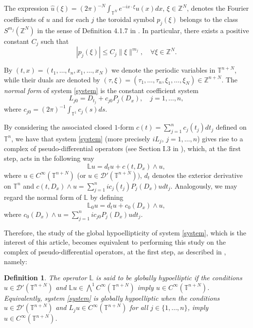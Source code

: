 \documentclass[12pt]{elsarticle}
\newtheorem{definition}[theorem]{Definition}
\numberwithin{equation}{section}
\begin{document}
The expression $\widehat{u}(\xi) = (2\pi)^{-N} \int_{\mathbb{T}^N}{e^{- i x \cdot \xi} u(x) dx}$, $\xi \in \mathbb{Z}^N$, denotes the Fourier coefficients of $u$ and for each $j$ the toroidal symbol  $p_j(\xi)$ belongs to the class $S^{m_j}(\mathbb{Z}^N)$ in the sense of Definition 4.1.7 in \cite{RT3}. In particular, there exists  a positive constant $C_j$ such that 
\begin{equation}\label{bound-symb}
|p_j(\xi)| \leq C_j \|\xi\| ^{m_j}, \quad \forall \xi \in \mathbb{Z}^{N}.
\end{equation}

By $(t,x)=(t_1,\ldots,t_n,x_1,\ldots,x_N)$ we denote the periodic variables in $\mathbb{T}^{n+N}$, while their duals  are denoted by 
$(\tau, \xi) = (\tau_1, \ldots, \tau_n, \xi_1, \ldots, \xi_N)  \in \mathbb{Z}^{n+N}.$ The \textit{normal form} of  system \eqref{system} is the constant coefficient  system 
\begin{equation}\label{normal-form}
L_{j0} = D_{t_j} + c_{j0} P_j(D_x),\quad   j=1,\ldots,n,
\end{equation}
where $c_{j0}=(2\pi)^{-1}\int_{\mathbb{T}^1}c_j(s)ds$.

By considering the associated closed $1$-form $c(t)=\sum_{j=1}^{n}c_j(t_j)dt_j$ defined on $\mathbb{T}^n$, we have that  system \eqref{system} (more precisely $iL_j$, $j=1,\ldots, n$) gives rise to a complex of pseudo-differential operators (see Section I.3 in \cite{treves76}), 
which, at the first step, acts in the following way
$$
\mathbb{L}u=d_tu+c(t,D_x)\wedge u,
$$
where $ u\in C^{\infty}(\mathbb{T}^{n+N})$ (or $u\in \mathcal{D}'(\mathbb{T}^{n+N}))$, $d_t$ denotes the exterior derivative on $\mathbb{T}^n$ and $c(t,D_x)\wedge u=\sum_{j=1}^{n}i c_j(t_j)P_j(D_x)udt_j$. Analogously, we  may regard the normal form of $\mathbb{L}$  by defining 
$$
\mathbb{L}_0 u=d_tu+c_0(D_x)\wedge u,
$$
where $c_0(D_x) \wedge u=\sum_{j=1}^{n}i c_{j0}P_j(D_x)udt_j$. 
 
Therefore, the study of the global hypoellipticity of  system \eqref{system}, which is the interest of this article, becomes equivalent  to performing this study on the complex of pseudo-differential operators, at the first step, as described in \cite{Maire80}, namely:



\begin{definition}\label{def-GH}
The operator $\mathbb{L}$ is said to be globally hypoelliptic if the conditions $u \in \mathcal{D}'(\mathbb{T}^{n+N})$  and $\mathbb{L}u\in\bigwedge^1 C^{\infty}(\mathbb{T}^{n+N})$ imply $u  \in C^{\infty}(\mathbb{T}^{n+N})$. Equi\-va\-lently,   system \eqref{system} is globally hypoelliptic when the conditions $u \in \mathcal{D}'(\mathbb{T}^{n+N})$ and   $L_j u \in C^{\infty}(\mathbb{T}^{n+N})$ for all $j\in\{1, \ldots, n\}$, imply $u  \in C^{\infty}(\mathbb{T}^{n+N})$.
\end{definition}
\end{document}

